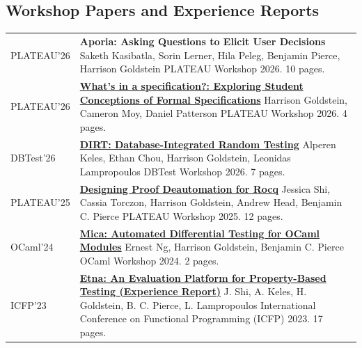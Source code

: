 \documentclass[a4paper]{article}
\newcommand{\semibf}{\fontseries{semibold}\selectfont}
\begin{document}
\subsection*{Workshop Papers and Experience Reports}
\vspace{-5mm}
\begin{longtable}{@{}p{}p{}@{}}
  PLATEAU'26 &
    {\bf Aporia: Asking Questions to Elicit User Decisions} \newline
    Saketh Kasibatla, Sorin Lerner, Hila Peleg, Benjamin Pierce, {\semibf Harrison Goldstein} \newline
    PLATEAU Workshop 2026. 10 pages.
    \\
  PLATEAU'26 &
    \href{https://doi.org/10.1184/R1/31816747}{\bf What's in a specification?: Exploring Student Conceptions of Formal Specifications} \newline
    {\semibf Harrison Goldstein}, Cameron Moy, Daniel Patterson \newline
    PLATEAU Workshop 2026. 4 pages.
    \\
  DBTest'26 &
    \href{https://doi.org/10.1145/3810991.3811632}{\bf DIRT: Database-Integrated Random Testing} \newline
    Alperen Keles, Ethan Chou, {\semibf Harrison Goldstein}, Leonidas Lampropoulos \newline
    DBTest Workshop 2026. 7 pages.
    \\
  PLATEAU'25 &
    \href{https://doi.org/10.1184/R1/29087003}{\bf Designing Proof Deautomation for Rocq} \newline
    Jessica Shi, Cassia Torczon, {\semibf Harrison Goldstein}, Andrew Head, Benjamin C. Pierce \newline
    PLATEAU Workshop 2025. 12 pages.
    \\
  OCaml'24 &
    \href{https://arxiv.org/abs/2408.14561}{\bf Mica: Automated Differential Testing for OCaml Modules} \newline
    Ernest Ng, {\semibf Harrison Goldstein}, Benjamin C. Pierce \newline
    OCaml Workshop 2024. 2 pages.
    \\
  ICFP'23 &
    \href{https://dl.acm.org/doi/abs/10.1145/3607860}{\bf Etna: An Evaluation Platform for Property-Based Testing (Experience Report)} \newline
    J. Shi, A. Keles, {\semibf H. Goldstein}, B. C. Pierce, L. Lampropoulos \newline
    International Conference on Functional Programming (ICFP) 2023. 17 pages.

\end{longtable}
\end{document}

